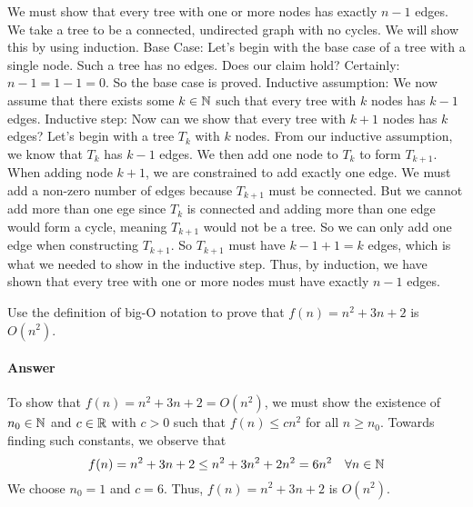 \documentclass{article}
\begin{document}
We must show that every tree with one or more nodes has exactly $n-1$ edges.
We take a tree to be a connected, undirected graph with no cycles.
We will show this by using induction. \parspace
Base Case: Let's begin with the base case of a tree with a single node.
Such a tree has no edges.
Does our claim hold?
Certainly: $n-1 = 1-1 = 0$.
So the base case is proved. \parspace
Inductive assumption: We now assume that there exists some $k \in {\mathbb N}$ such that every tree with $k$ nodes has $k-1$ edges. \parspace
Inductive step: Now can we show that every tree with $k+1$ nodes has $k$ edges?
Let's begin with a tree $T_k$ with $k$ nodes.
From our inductive assumption, we know that $T_k$ has $k-1$ edges.
We then add one node to $T_k$ to form $T_{k+1}$. \parspace
When adding node $k+1$, we are constrained to add exactly one edge.
We must add a non-zero number of edges because $T_{k+1}$ must be connected.
But we cannot add more than one ege since $T_k$ is connected and adding more than one edge would form a cycle, meaning $T_{k+1}$ would not be a tree.
So we can only add one edge when constructing $T_{k+1}$.
So $T_{k+1}$ must have $k-1+1=k$ edges, which is what we needed to show in the inductive step. \parspace
Thus, by induction, we have shown that every tree with one or more nodes must have exactly $n-1$ edges.




\nextprob
{}

Use the definition of big-O notation to prove that $f(n)=n^2 + 3n +2$ is
$O(n^2)$.

\paragraph{Answer}


To show that $f(n) = n^2 + 3n + 2 = O(n^2)$, we must show the existence of $n_0 \in {\mathbb N}$ and $c \in {\mathbb R}$ with $ c > 0$ such that $f(n) \leq c n^2$  for all $n \geq n_0$.
Towards finding such constants, we observe that
$$ f(n) = n^2 + 3n + 2 \leq n^2 + 3n^2 + 2n^2 = 6n^2 \hspace{1em} \forall n \in {\mathbb N} $$
We choose $n_0 = 1$ and $c = 6$.
Thus, $f(n) = n^2 + 3n + 2 $ is $O(n^2)$.




\nextprob
{}
\end{document}
